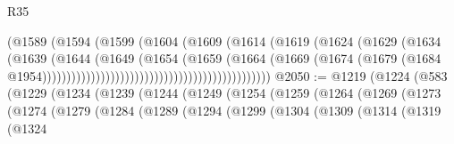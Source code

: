 \begin{lexlean}{R35}
\begin{coremodule}
                                                          (@1589
                                                            (@1594
                                                              (@1599
                                                                (@1604
                                                                  (@1609
                                                                    (@1614
                                                                      (@1619
                                                                        (@1624
                                                                          (@1629
                                                                            (@1634
                                                                              (@1639
                                                                                (@1644
                                                                                  (@1649
                                                                                    (@1654
                                                                                      (@1659
                                                                                        (@1664
                                                                                          (@1669
                                                                                            (@1674
                                                                                              (@1679
                                                                                                (@1684
                                                                                                  @1954)))))))))))))))))))))))))))))))))))))))))))))))
@2050 := @1219
    (@1224
      (@583
        (@1229
          (@1234
            (@1239
              (@1244
                (@1249
                  (@1254
                    (@1259
                      (@1264
                        (@1269
                          (@1273
                            (@1274
                              (@1279
                                (@1284
                                  (@1289
                                    (@1294
                                      (@1299
                                        (@1304
                                          (@1309
                                            (@1314
                                              (@1319
                                                (@1324

\end{coremodule}
\end{lexlean}
